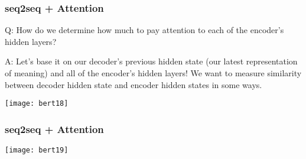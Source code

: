 




\begin{frame}[fragile]\frametitle{seq2seq + Attention}

Q: How do we determine how much to pay attention to each of the encoder’s hidden layers? 

A: Let’s base it on our decoder’s previous hidden state (our latest representation of meaning) and all of the encoder’s hidden layers! We want to measure similarity between decoder hidden state and encoder hidden states in some ways. 



\begin{center}
\texttt{[image: bert18]}
\end{center}	

\end{frame}

\begin{frame}[fragile]\frametitle{seq2seq + Attention}





\begin{center}
\texttt{[image: bert19]}
\end{center}	

\end{frame}

